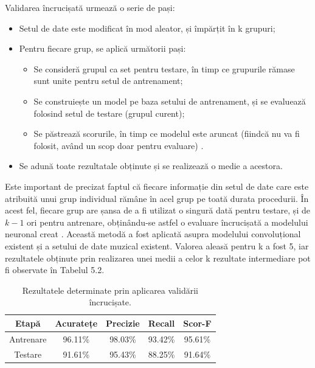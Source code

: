 \documentclass[a4paper,12pt]{report}
\begin{document}
Validarea încrucișată urmează o serie de pași:
\begin{itemize}
    \setlength\itemsep{0.2em}
    \item Setul de date este modificat în mod aleator, și împărțit în k grupuri;
    \item Pentru fiecare grup, se aplică următorii pași:
    \begin{itemize}
        \item Se consideră grupul ca set pentru testare, în timp ce 
    grupurile rămase sunt unite pentru setul de antrenament;
        \item Se construiește un model pe baza setului de antrenament, 
    și se evaluează folosind setul de testare (grupul curent);
        \item Se păstrează scorurile, în timp ce modelul este aruncat (fiindcă nu va fi folosit, 
        având un scop doar pentru evaluare) \cite{WEBSITE:k-fold-cross-validation}.
    \end{itemize}
    \item Se adună toate rezultatale obținute și se realizează o medie a 
    acestora.
\end{itemize}

Este important de precizat faptul că fiecare informație din setul 
de date care este atribuită unui grup individual rămâne 
în acel grup pe toată durata procedurii. În acest fel, fiecare 
grup are șansa de a fi utilizat o singură dată pentru testare, și de $k-1$ 
ori pentru antrenare, obținându-se astfel o evaluare 
încrucișată a modelului neuronal creat \cite{WEBSITE:k-fold-cross-validation}. 
Această metodă 
a fost aplicată asupra modelului convoluțional existent și 
a setului de date muzical existent. Valorea aleasă pentru k a 
fost 5, iar rezultatele obținute prin realizarea 
unei medii a celor k rezultate intermediare 
pot fi observate în Tabelul 5.2.

\begin{table}[h!]
    \begin{center}
        \begin{tabular}{ | c | c | c | c | c | }
            \hline 
                Etapă & Acuratețe & Precizie & Recall & Scor-F \\
                \hline \hline 
                Antrenare & 96.11\% & 98.03\% & 93.42\% & 95.61\%  \\
                \hline
                Testare & 91.61\% & 95.43\% & 88.25\% & 91.64\%  \\
            \hline
        \end{tabular}
        \caption{Rezultatele determinate prin aplicarea validării încrucișate.}
    \end{center}
\end{table}
\end{document}

